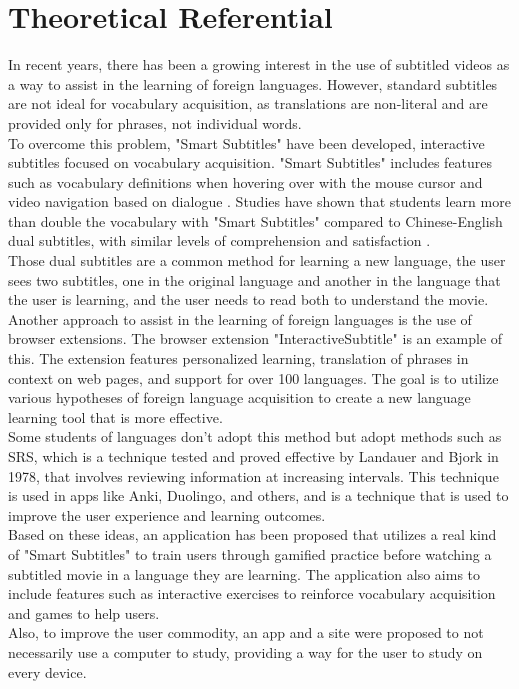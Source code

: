 \documentclass[12pt]{article}
\begin{document}
\section{Theoretical Referential}
In recent years, there has been a growing interest in the use of subtitled videos as a way to assist in the learning of foreign languages. However, standard subtitles are not ideal for vocabulary acquisition, as translations are non-literal and are provided only for phrases, not individual words. \\
To overcome this problem, "Smart Subtitles" have been developed, interactive subtitles focused on vocabulary acquisition. "Smart Subtitles" includes features such as vocabulary definitions when hovering over with the mouse cursor and video navigation based on dialogue \cite{Kovacs13}. Studies have shown that students learn more than double the vocabulary with "Smart Subtitles" compared to Chinese-English dual subtitles, with similar levels of comprehension and satisfaction \cite{Kovacs14}. \\ 
Those dual subtitles are a common method for learning a new language, the user sees two subtitles, one in the original language and another in the language that the user is learning, and the user needs to read both to understand the movie. \\
Another approach to assist in the learning of foreign languages is the use of browser extensions. The browser extension "InteractiveSubtitle" \cite{ElBatanony21} is an example of this. The extension features personalized learning, translation of phrases in context on web pages, and support for over 100 languages. The goal is to utilize various hypotheses of foreign language acquisition to create a new language learning tool that is more effective. \\ 
Some students of languages don't adopt this method but adopt methods such as SRS, which is a technique tested and proved effective by Landauer and Bjork in 1978, that involves reviewing information at increasing intervals. This technique is used in apps like Anki, Duolingo, and others, and is a technique that is used to improve the user experience and learning outcomes. \\
Based on these ideas, an application has been proposed that utilizes a real kind of "Smart Subtitles" to train users through gamified practice before watching a subtitled movie in a language they are learning. The application also aims to include features such as interactive exercises to reinforce vocabulary acquisition and games to help users.  \\
Also, to improve the user commodity, an app and a site were proposed to not necessarily use a computer to study, providing a way for the user to study on every device. 
\end{document}
